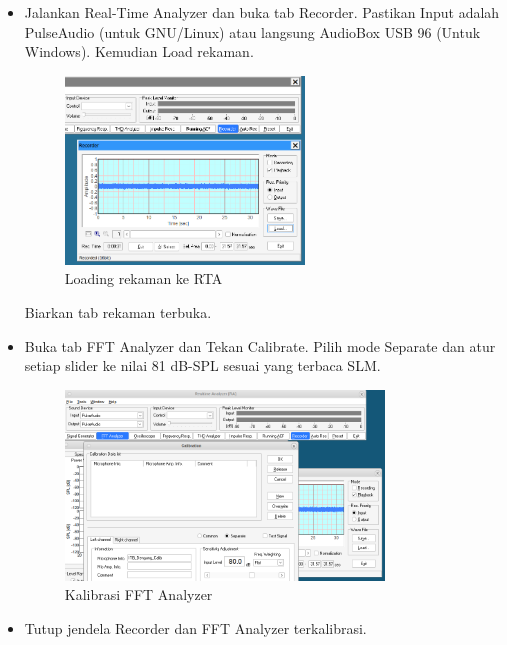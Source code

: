 \documentclass{article}
\begin{document}
	\begin{itemize}
		\item Jalankan Real-Time Analyzer dan buka tab Recorder.
		Pastikan Input adalah PulseAudio (untuk GNU/Linux) atau langsung AudioBox USB 96 (Untuk Windows).
		Kemudian Load rekaman.
		
		\begin{figure}[H]
			\centering
			\includegraphics[width=0.6\textwidth,angle=0]{images/rta_load}
			\caption{Loading rekaman ke RTA}
		\end{figure}
		
		Biarkan tab rekaman terbuka.
		
		\item Buka tab FFT Analyzer dan Tekan Calibrate.
		Pilih mode Separate dan atur setiap slider ke nilai 81 dB-SPL sesuai yang terbaca SLM.
		
		\begin{figure}[H]
			\centering
			\includegraphics[width=0.8\textwidth,angle=0]{images/rta_calib}
			\caption{Kalibrasi FFT Analyzer}
		\end{figure}
		
		\newpage
		\item Tutup jendela Recorder dan FFT Analyzer terkalibrasi.
		

\end{itemize}
\end{document}
